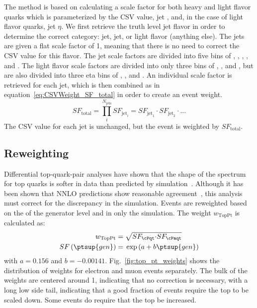 The method is based on calculating a scale factor for both heavy and light flavor quarks which is parameterized by the CSV value, jet \pt, and, in the case of light flavor quarks, jet $\eta$.
We first retrieve the truth level jet flavor in order to determine the correct category: \cPqb jet, \cPqc jet, or light flavor (anything else).
The \cPqc jets are given a flat scale factor of 1, meaning that there is no need to correct the CSV value for this flavor.
The \cPqb jet scale factors are divided into five \pt bins of \ptlt{40\gev}, \ptrange{40\gev}{60\gev}, \ptrange{60\gev}{100\gev}, \ptrange{100\gev}{160\gev}, and \ptgt{160\gev}.
The light flavor scale factors are divided into only three \pt bins of \ptlt{40\gev}, \ptrange{40\gev}{60\gev}, and \ptgt{60\gev}, but are also divided into three eta bins of , , and .
An individual scale factor is retrieved for each jet, which is then combined as in equation~\ref{eq:CSVWeight_SF_total} in order to create an event weight.
\begin{equation}\label{eq:CSVWeight_SF_total}
  SF_{\mathrm{total}}=\prod_{i}^{N_{\mathrm{jets}}}SF_{\mathrm{jet}_{i}}=SF_{\mathrm{jet}_{1}}{\cdot}SF_{\mathrm{jet}_{2}}{\cdot}...
\end{equation}
The CSV value for each jet is unchanged, but the event is weighted by $SF_{\mathrm{total}}$.

\subsection{\texorpdfstring{\ttbar}{TTbar} Reweighting}
\label{sec:topPt_reweighting}
Differential top-quark-pair analyses have shown that the shape of the \pt spectrum for top quarks is softer in data than predicted by simulation~\cite{Chatrchyan:2012saa,TopPtReweighting}.
Although it has been shown that NNLO predictions show reasonable agreement~\cite{Kidonakis2014}, this analysis must correct for the discrepancy in the \ttbar simulation.
Events are reweighted based on the \pt of the generator level \cPqt and \cPaqt in only the \ttbar simulation.
The weight $w_{\mathrm{TopPt}}$ is calculated as:
\begin{align}
  w_{\mathrm{TopPt}} ={}& \sqrt{SF_{\cPqt}{\cdot}SF_{\cPaqt}} \label{eq:TopPtWeight} \\
  SF\left(\ptsup{gen}\right) ={}& \exp\left(a+b\ptsup{gen}\right) \label{eq:TopPtSF}
\end{align}
with $a=0.156$ and $b=-0.00141$.
Fig.~\ref{fig:top_pt_weights} shows the distribution of weights for electron and muon events separately.
The bulk of the weights are centered around 1, indicating that no correction is necessary, with a long low side tail, indicating that a good fraction of events require the top \pt to be scaled down.
Some events do require that the top \pt be increased.

